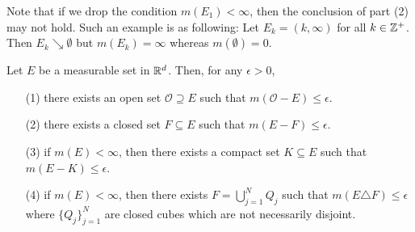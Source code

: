 \documentclass[12pt, a4paper, openany, twoside]{book}
\theoremstyle{definition}
\theoremstyle{remark}
\theoremstyle{plain}
\numberwithin{equation}{section}
\begin{document}
Note that if we drop the condition $m(E_1)<\infty$, then the conclusion of part (2) may not hold. Such an example is as following: Let $E_k=(k,\infty)$ for all $k\in{\mathbb {Z}}^+$. Then $E_k\searrow\emptyset$ but $m(E_k)=\infty$ whereas $m(\emptyset)=0$.

\vspace{5mm}
\begin{tcolorbox}[colback=yellow!10!white,colframe=red!75!black,title=Theorem 1.3.5]\label{Theorem 1.3.5}
    Let $E$ be a measurable set in ${\mathbb {R}}^d$. Then, for any $\epsilon>0$, 
    \begin{enumerate}
        \item [(1)] there exists an open set $\mathcal{O}\supseteq E$ such that $m(\mathcal{O}-E)\leq\epsilon$.
        \item [(2)] there exists a closed set $F\subseteq E$ such that $m(E-F)\leq\epsilon$.
        \item [(3)] if $m(E)<\infty$, then there exists a compact set $K\subseteq E$ such that $m(E-K)\leq\epsilon$.
        \item [(4)] if $m(E)<\infty$, then there exists $F=\bigcup_{j=1}^{N}{Q_j}$ such that $m(E\triangle F)\leq \epsilon$ where $\{Q_j\}_{j=1}^{N}$ are closed cubes which are not necessarily disjoint. 
    \end{enumerate}
\end{tcolorbox}
\end{document}
